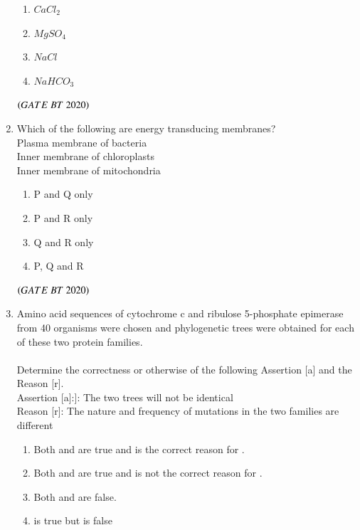 \documentclass[journal,12pt,onecolumn]{IEEEtran}
\theoremstyle{remark}
\begin{document}
\begin{enumerate}[label=Q\arabic*:]
\begin{multicols}{4}
\begin{enumerate}
\item\;$CaCl_2$
\item\;$MgSO_4$
\item\;$NaCl$
\item\;$NaHCO_3$

\end{enumerate} 
\end{multicols}
\hfill$\left(GATE\ BT\ 2020\right)$

\item Which of the following are energy transducing membranes?\\
 Plasma membrane of bacteria\\
 Inner membrane of chloroplasts\\
 Inner membrane of mitochondria
\begin{multicols}{2}
\begin{enumerate}

\item\;P and Q only
\item\;P and R only
\item\;Q and R only
\item\;P, Q and R

\end{enumerate}
\end{multicols}
\hfill$\left(GATE\ BT\ 2020\right)$

\item Amino acid sequences of cytochrome c and ribulose 5-phosphate epimerase from 40 organisms were chosen and phylogenetic trees were obtained for each of these two protein families.\\
\\Determine the correctness or otherwise of the following Assertion [a] and the Reason [r].\\Assertion [a]:]: The two trees will not be identical\\
Reason [r]: The nature and frequency of mutations in the two families are
different
\begin{multicols}{2}
\begin{enumerate}

\item\;Both   and   are true and   is the correct reason for .
\item\;Both   and   are true and  is not the correct reason for  .
\item\;Both    and   are false.
\item\;  is true but   is  false


\end{enumerate}
\end{multicols}
\end{enumerate}
\end{document}
